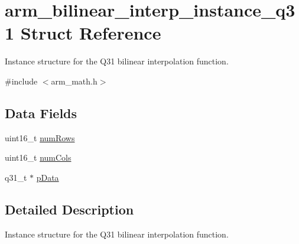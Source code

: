 \hypertarget{structarm__bilinear__interp__instance__q31}{\section{arm\-\_\-bilinear\-\_\-interp\-\_\-instance\-\_\-q31 Struct Reference}
\label{structarm__bilinear__interp__instance__q31}
}


Instance structure for the Q31 bilinear interpolation function.  




{\ttfamily \#include $<$arm\-\_\-math.\-h$>$}

\subsection*{Data Fields}
\begin{DoxyCompactItemize}
\item 
uint16\-\_\-t \hyperlink{structarm__bilinear__interp__instance__q31_a1bcf80ccdc2acc29198f1592ae300390}{num\-Rows}
\item 
uint16\-\_\-t \hyperlink{structarm__bilinear__interp__instance__q31_a4bb5ec0d13eb4c9cf887aa8366a44117}{num\-Cols}
\item 
q31\-\_\-t $\ast$ \hyperlink{structarm__bilinear__interp__instance__q31_ad296f76577326ff280726323536eed6d}{p\-Data}
\end{DoxyCompactItemize}


\subsection{Detailed Description}
Instance structure for the Q31 bilinear interpolation function. 

